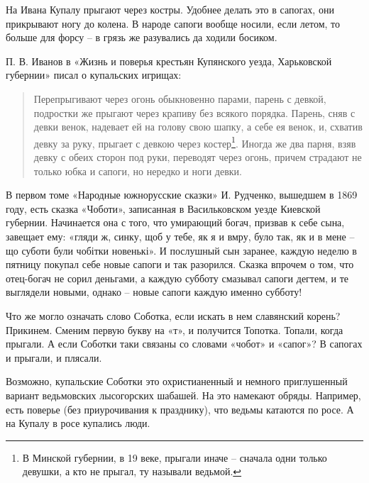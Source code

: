 


На Ивана Купалу прыгают через костры. Удобнее делать это в сапогах, они прикрывают ногу до колена. В народе сапоги вообще носили, если летом, то больше для форсу – в грязь же разувались да ходили босиком.

П. В. Иванов в «Жизнь и поверья крестьян Купянского уезда, Харьковской губернии»\cite{ivanov01} писал о купальских игрищах:

\begin{quotation}
Перепрыгивают через огонь обыкновенно парами, парень с девкой, подростки же прыгают через крапиву без всякого порядка. Парень, сняв с девки венок, надевает ей на голову свою шапку, а себе ея венок, и, схватив девку за руку, прыгает с девкою через костер\footnote{В Минской губернии, в 19 веке, прыгали иначе – сначала одни только девушки, а кто не прыгал, ту называли ведьмой.}. Иногда же два парня, взяв девку с обеих сторон под руки, переводят через огонь, причем страдают не только юбка и сапоги, но нередко и ноги девки.
\end{quotation}

В первом томе «Народные южнорусские сказки» И. Рудченко, вышедшем в 1869 году, есть сказка «Чоботи», записанная в Васильковском уезде Киевской губернии. Начинается она с того, что умирающий богач, призвав к себе сына, завещает ему: «гляди ж, синку, щоб у тебе, як я и вмру, було так, як и в мене – що суботи були чобітки новенькі». И послушный сын заранее, каждую неделю в пятницу покупал себе новые сапоги и так разорился. Сказка впрочем о том, что отец-богач не сорил деньгами, а каждую субботу смазывал сапоги дегтем, и те выглядели новыми, однако – новые сапоги каждую именно субботу!

Что же могло означать слово Соботка, если искать в нем славянский корень? Прикинем. Сменим первую букву на «т», и получится Топотка. Топали, когда прыгали. А если Соботки таки связаны со словами «чобот» и «сапог»? В сапогах и прыгали, и плясали.

Возможно, купальские Соботки это охристианенный и немного приглушенный вариант ведьмовских лысогорских шабашей. На это намекают обряды. Например, есть поверье (без приурочивания к празднику), что ведьмы катаются по росе. А на Купалу в росе купались люди.

